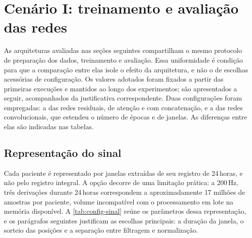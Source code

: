 \section{Cenário I: treinamento e avaliação das redes}
\label{sec:configuracao-experimental}


As arquiteturas avaliadas nas seções seguintes compartilham o mesmo
protocolo de preparação dos dados, treinamento e avaliação. Essa
uniformidade é condição para que a comparação entre elas isole o efeito da
arquitetura, e não o de escolhas acessórias de configuração. Os valores
adotados foram fixados a partir das primeiras execuções e mantidos ao longo
dos experimentos; são apresentados a seguir, acompanhados da justificativa
correspondente. Duas configurações foram empregadas: a das redes residuais,
de atenção e com concatenação, e a das redes convolucionais, que estendeu o número
de épocas e de janelas. As diferenças entre elas são indicadas nas tabelas.


\subsection{Representação do sinal}
\label{subsec:config-sinal}

Cada paciente é representado por janelas extraídas de seu registro de
24\,horas, e não pelo registro integral. A opção decorre de uma limitação
prática: a 200\,Hz, três derivações durante 24\,horas correspondem a
aproximadamente 17 milhões de amostras por paciente, volume incompatível com
o processamento em lote na memória disponível. A
\autoref{tab:config-sinal} reúne os parâmetros dessa representação, e os
parágrafos seguintes justificam as escolhas principais: a duração da janela,
o sorteio das posições e a separação entre filtragem e normalização.

